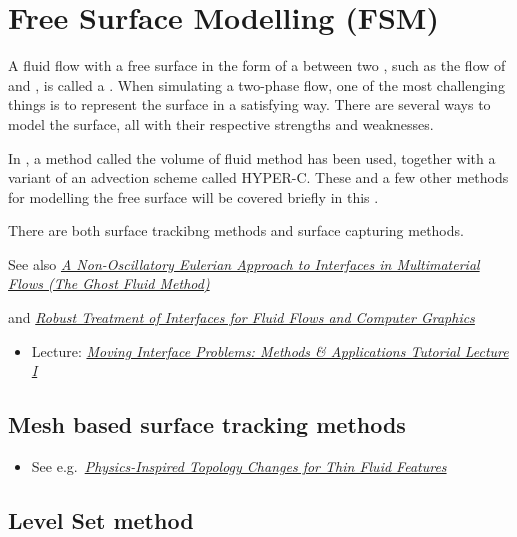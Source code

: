 \chapter{Free Surface Modelling (FSM)}

A fluid flow with a free surface in the form of a  between two , such as the flow of \water and \air, is called a . When simulating a two-phase flow, one of the most challenging things is to represent the surface in a satisfying way. There are several ways to model the surface, all with their respective strengths and weaknesses.

In \thiswork, a method called the volume of fluid method has been used, together with a variant of an advection scheme called HYPER-C. These and a few other methods for modelling the free surface will be covered briefly in this \levelname.


\HRule

There are both surface trackibng methods and surface capturing methods.

See also \textit{\href{http://physbam.stanford.edu/~fedkiw/papers/cam1998-17.pdf}{A Non-Oscillatory Eulerian Approach to Interfaces in Multimaterial Flows (The Ghost Fluid Method)}}

and \textit{\href{http://physbam.stanford.edu/~fedkiw/papers/stanford2002-07.pdf}{Robust Treatment of Interfaces for Fluid Flows and Computer Graphics}}

\begin{itemize}
    \item Lecture: \textit{\href{http://www.ims.nus.edu.sg/Programs/fluiddynamic/files/Lecture1-basics.pdf}{Moving Interface Problems: Methods \& Applications Tutorial Lecture I}}
\end{itemize}

\section{Mesh based surface tracking methods}

\begin{itemize}
    \item See e.g.\ \textit{\href{http://www.cc.gatech.edu/~turk/my_papers/thin_fluid_features.pdf}{Physics-Inspired Topology Changes for Thin Fluid Features}}
\end{itemize}

\section{Level Set method}


